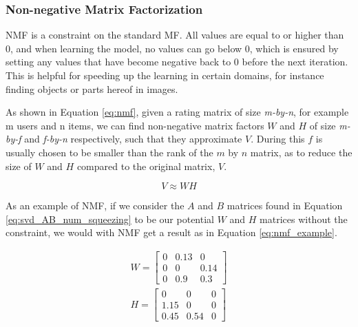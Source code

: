 \subsubsection{Non-negative Matrix Factorization}

NMF is a constraint on the standard MF. All values are equal to or higher than 0, and when learning the model, no values can go below 0, which is ensured by setting any values that have become negative back to 0 before the next iteration. This is helpful for speeding up the learning in certain domains, for instance finding objects or parts hereof in images\cite{nnmf}.

As shown in Equation \ref{eq:nmf}, given a rating matrix of size \textit{m-by-n}, for example m users and n items, we can find non-negative matrix factors $W$ and $H$ of size \textit{m-by-f} and \textit{f-by-n} respectively, such that they approximate $V$. During this $f$ is usually chosen to be smaller than the rank of the $m$ by $n$ matrix, as to reduce the size of $W$ and $H$ compared to the original matrix, $V$\cite{LeeNMF}.

\begin{equation} \label{eq:nmf}
	V \approx W H
\end{equation}



As an example of NMF, if we consider the $A$ and $B$ matrices found in Equation \ref{eq:svd_AB_num_squeezing} to be our potential $W$ and $H$ matrices without the constraint, we would with NMF get a result as in Equation \ref{eq:nmf_example}.

\begin{equation}\label{eq:nmf_example}
\begin{split}
W =
\begin{bmatrix}
0 & 0.13 & 0\\
0 & 0 & 0.14\\
0 & 0.9 & 0.3
\end{bmatrix}
\\
H = 
\begin{bmatrix}
0 & 0 & 0\\
1.15 & 0 & 0\\
0.45 & 0.54 & 0
\end{bmatrix}
\end{split}
\end{equation}